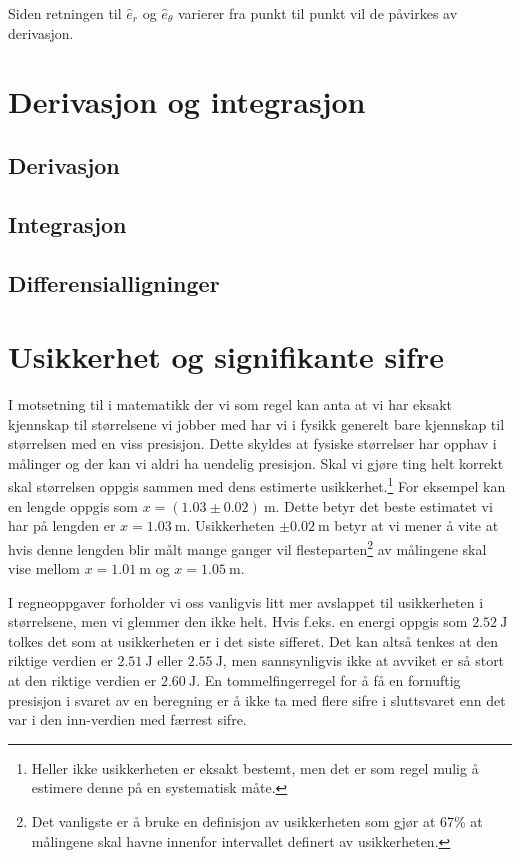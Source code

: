 \documentclass[a4paper,norsk,12pt]{book}
\def\er{\ensuremath{\hat{e}_r}}
\def\eth{\ensuremath{\hat{e}_\theta}}
\begin{document}
Siden retningen til $\er$ og $\eth$ varierer fra punkt til punkt vil de påvirkes av derivasjon. 

\chapter{Derivasjon og integrasjon}
\section{Derivasjon}
\section{Integrasjon}
\section{Differensialligninger}

\chapter{Usikkerhet og signifikante sifre}
I motsetning til i matematikk der vi som regel kan anta at vi har eksakt kjennskap til størrelsene vi jobber med har vi i fysikk generelt bare kjennskap til størrelsen med en viss presisjon. Dette skyldes at fysiske størrelser har opphav i målinger og der kan vi aldri ha uendelig presisjon. Skal vi gjøre ting helt korrekt skal størrelsen oppgis sammen med dens estimerte usikkerhet.\footnote{Heller ikke usikkerheten er eksakt bestemt, men det er som regel mulig å estimere denne på en systematisk måte.
} For eksempel kan en lengde oppgis som $x=(1.03\pm0.02)~\mathrm{m}$. Dette betyr det beste estimatet vi har på lengden er $x = 1.03~\mathrm{m}$. Usikkerheten $\pm0.02~\mathrm{m}$ betyr at vi mener å vite at hvis denne lengden blir målt mange ganger vil flesteparten\footnote{Det vanligste er å bruke en definisjon av usikkerheten som gjør at 67\% at målingene skal havne innenfor intervallet definert av usikkerheten.} av målingene skal vise mellom $x=1.01~\mathrm{m}$ og $x=1.05~\mathrm{m}$. 

I regneoppgaver forholder vi oss vanligvis litt mer avslappet til usikkerheten i størrelsene, men vi glemmer den ikke helt. Hvis f.eks. en energi oppgis som $2.52~\mathrm{J}$ tolkes det som at usikkerheten er i det siste sifferet. Det kan altså tenkes at den riktige verdien er $2.51~\mathrm{J}$ eller $2.55~\mathrm{J}$, men sannsynligvis ikke at avviket er så stort at den riktige verdien er $2.60~\mathrm{J}$. En tommelfingerregel for å få en fornuftig presisjon i svaret av en beregning er å ikke ta med flere sifre i sluttsvaret enn det var i den inn-verdien med færrest sifre.
\end{document}
